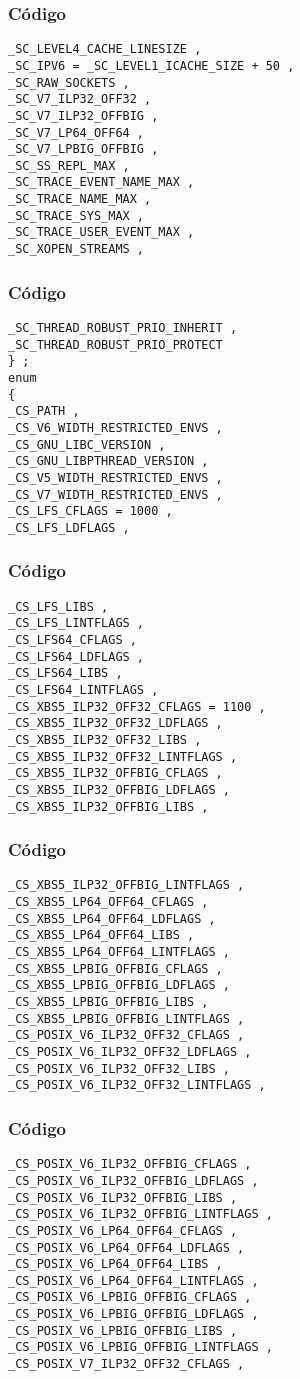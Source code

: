 \documentclass{beamer}
\begin{document}
\begin{frame}[fragile]
\frametitle{C\'odigo}
\begin{verbatim}
_SC_LEVEL4_CACHE_LINESIZE , 
_SC_IPV6 = _SC_LEVEL1_ICACHE_SIZE + 50 , 
_SC_RAW_SOCKETS , 
_SC_V7_ILP32_OFF32 , 
_SC_V7_ILP32_OFFBIG , 
_SC_V7_LP64_OFF64 , 
_SC_V7_LPBIG_OFFBIG , 
_SC_SS_REPL_MAX , 
_SC_TRACE_EVENT_NAME_MAX , 
_SC_TRACE_NAME_MAX , 
_SC_TRACE_SYS_MAX , 
_SC_TRACE_USER_EVENT_MAX , 
_SC_XOPEN_STREAMS , 
\end{verbatim}
\end{frame}
\begin{frame}[fragile]
\frametitle{C\'odigo}
\begin{verbatim}
_SC_THREAD_ROBUST_PRIO_INHERIT , 
_SC_THREAD_ROBUST_PRIO_PROTECT 
} ; 
enum 
{ 
_CS_PATH , 
_CS_V6_WIDTH_RESTRICTED_ENVS , 
_CS_GNU_LIBC_VERSION , 
_CS_GNU_LIBPTHREAD_VERSION , 
_CS_V5_WIDTH_RESTRICTED_ENVS , 
_CS_V7_WIDTH_RESTRICTED_ENVS , 
_CS_LFS_CFLAGS = 1000 , 
_CS_LFS_LDFLAGS , 
\end{verbatim}
\end{frame}
\begin{frame}[fragile]
\frametitle{C\'odigo}
\begin{verbatim}
_CS_LFS_LIBS , 
_CS_LFS_LINTFLAGS , 
_CS_LFS64_CFLAGS , 
_CS_LFS64_LDFLAGS , 
_CS_LFS64_LIBS , 
_CS_LFS64_LINTFLAGS , 
_CS_XBS5_ILP32_OFF32_CFLAGS = 1100 , 
_CS_XBS5_ILP32_OFF32_LDFLAGS , 
_CS_XBS5_ILP32_OFF32_LIBS , 
_CS_XBS5_ILP32_OFF32_LINTFLAGS , 
_CS_XBS5_ILP32_OFFBIG_CFLAGS , 
_CS_XBS5_ILP32_OFFBIG_LDFLAGS , 
_CS_XBS5_ILP32_OFFBIG_LIBS , 
\end{verbatim}
\end{frame}
\begin{frame}[fragile]
\frametitle{C\'odigo}
\begin{verbatim}
_CS_XBS5_ILP32_OFFBIG_LINTFLAGS , 
_CS_XBS5_LP64_OFF64_CFLAGS , 
_CS_XBS5_LP64_OFF64_LDFLAGS , 
_CS_XBS5_LP64_OFF64_LIBS , 
_CS_XBS5_LP64_OFF64_LINTFLAGS , 
_CS_XBS5_LPBIG_OFFBIG_CFLAGS , 
_CS_XBS5_LPBIG_OFFBIG_LDFLAGS , 
_CS_XBS5_LPBIG_OFFBIG_LIBS , 
_CS_XBS5_LPBIG_OFFBIG_LINTFLAGS , 
_CS_POSIX_V6_ILP32_OFF32_CFLAGS , 
_CS_POSIX_V6_ILP32_OFF32_LDFLAGS , 
_CS_POSIX_V6_ILP32_OFF32_LIBS , 
_CS_POSIX_V6_ILP32_OFF32_LINTFLAGS , 
\end{verbatim}
\end{frame}
\begin{frame}[fragile]
\frametitle{C\'odigo}
\begin{verbatim}
_CS_POSIX_V6_ILP32_OFFBIG_CFLAGS , 
_CS_POSIX_V6_ILP32_OFFBIG_LDFLAGS , 
_CS_POSIX_V6_ILP32_OFFBIG_LIBS , 
_CS_POSIX_V6_ILP32_OFFBIG_LINTFLAGS , 
_CS_POSIX_V6_LP64_OFF64_CFLAGS , 
_CS_POSIX_V6_LP64_OFF64_LDFLAGS , 
_CS_POSIX_V6_LP64_OFF64_LIBS , 
_CS_POSIX_V6_LP64_OFF64_LINTFLAGS , 
_CS_POSIX_V6_LPBIG_OFFBIG_CFLAGS , 
_CS_POSIX_V6_LPBIG_OFFBIG_LDFLAGS , 
_CS_POSIX_V6_LPBIG_OFFBIG_LIBS , 
_CS_POSIX_V6_LPBIG_OFFBIG_LINTFLAGS , 
_CS_POSIX_V7_ILP32_OFF32_CFLAGS , 
\end{verbatim}
\end{frame}
\end{document}
